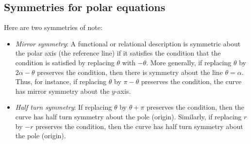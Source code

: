 \documentclass[10pt]{amsart}
\begin{document}
\subsection{Symmetries for polar equations}

Here are two symmetries of note:

\begin{itemize}
\item {\em Mirror symmetry}: A functional or relational description is
  symmetric about the polar axis (the reference line) if it satisfies
  the condition that the condition is satisfied by replacing $\theta$
  with $-\theta$. More generally, if replacing $\theta$ by $2\alpha -
  \theta$ preserves the condition, then there is symmetry about the
  line $\theta = \alpha$. Thus, for instance, if replacing $\theta$ by
  $\pi - \theta$ preserves the condition, the curve has mirror
  symmetry about the $y$-axis.
\item {\em Half turn symmetry}: If replacing $\theta$ by $\theta +
  \pi$ preserves the condition, then the curve has half turn symmetry
  about the pole (origin). Similarly, if replacing $r$ by $-r$
  preserves the condition, then the curve has half turn symmetry about
  the pole (origin).
\end{itemize}
\end{document}
